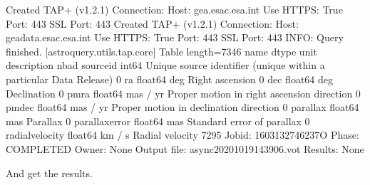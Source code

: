 \documentclass[letterpaper,10pt,english]{sphinxmanual}
\begin{document}
\begin{sphinxVerbatim}[commandchars=\\\{\}]
Created TAP+ (v1.2.1) \PYGZhy{} Connection:
	Host: gea.esac.esa.int
	Use HTTPS: True
	Port: 443
	SSL Port: 443
Created TAP+ (v1.2.1) \PYGZhy{} Connection:
	Host: geadata.esac.esa.int
	Use HTTPS: True
	Port: 443
	SSL Port: 443
INFO: Query finished. [astroquery.utils.tap.core]
\PYGZlt{}Table length=7346\PYGZgt{}
      name       dtype    unit                              description                             n\PYGZus{}bad
\PYGZhy{}\PYGZhy{}\PYGZhy{}\PYGZhy{}\PYGZhy{}\PYGZhy{}\PYGZhy{}\PYGZhy{}\PYGZhy{}\PYGZhy{}\PYGZhy{}\PYGZhy{}\PYGZhy{}\PYGZhy{}\PYGZhy{} \PYGZhy{}\PYGZhy{}\PYGZhy{}\PYGZhy{}\PYGZhy{}\PYGZhy{}\PYGZhy{} \PYGZhy{}\PYGZhy{}\PYGZhy{}\PYGZhy{}\PYGZhy{}\PYGZhy{}\PYGZhy{}\PYGZhy{} \PYGZhy{}\PYGZhy{}\PYGZhy{}\PYGZhy{}\PYGZhy{}\PYGZhy{}\PYGZhy{}\PYGZhy{}\PYGZhy{}\PYGZhy{}\PYGZhy{}\PYGZhy{}\PYGZhy{}\PYGZhy{}\PYGZhy{}\PYGZhy{}\PYGZhy{}\PYGZhy{}\PYGZhy{}\PYGZhy{}\PYGZhy{}\PYGZhy{}\PYGZhy{}\PYGZhy{}\PYGZhy{}\PYGZhy{}\PYGZhy{}\PYGZhy{}\PYGZhy{}\PYGZhy{}\PYGZhy{}\PYGZhy{}\PYGZhy{}\PYGZhy{}\PYGZhy{}\PYGZhy{}\PYGZhy{}\PYGZhy{}\PYGZhy{}\PYGZhy{}\PYGZhy{}\PYGZhy{}\PYGZhy{}\PYGZhy{}\PYGZhy{}\PYGZhy{}\PYGZhy{}\PYGZhy{}\PYGZhy{}\PYGZhy{}\PYGZhy{}\PYGZhy{}\PYGZhy{}\PYGZhy{}\PYGZhy{}\PYGZhy{}\PYGZhy{}\PYGZhy{}\PYGZhy{}\PYGZhy{}\PYGZhy{}\PYGZhy{}\PYGZhy{}\PYGZhy{}\PYGZhy{}\PYGZhy{} \PYGZhy{}\PYGZhy{}\PYGZhy{}\PYGZhy{}\PYGZhy{}
      source\PYGZus{}id   int64          Unique source identifier (unique within a particular Data Release)     0
             ra float64      deg                                                    Right ascension     0
            dec float64      deg                                                        Declination     0
           pmra float64 mas / yr                         Proper motion in right ascension direction     0
          pmdec float64 mas / yr                             Proper motion in declination direction     0
       parallax float64      mas                                                           Parallax     0
 parallax\PYGZus{}error float64      mas                                         Standard error of parallax     0
radial\PYGZus{}velocity float64   km / s                                                    Radial velocity  7295
Jobid: 1603132746237O
Phase: COMPLETED
Owner: None
Output file: async\PYGZus{}20201019143906.vot
Results: None
\end{sphinxVerbatim}

And get the results.
\end{document}
